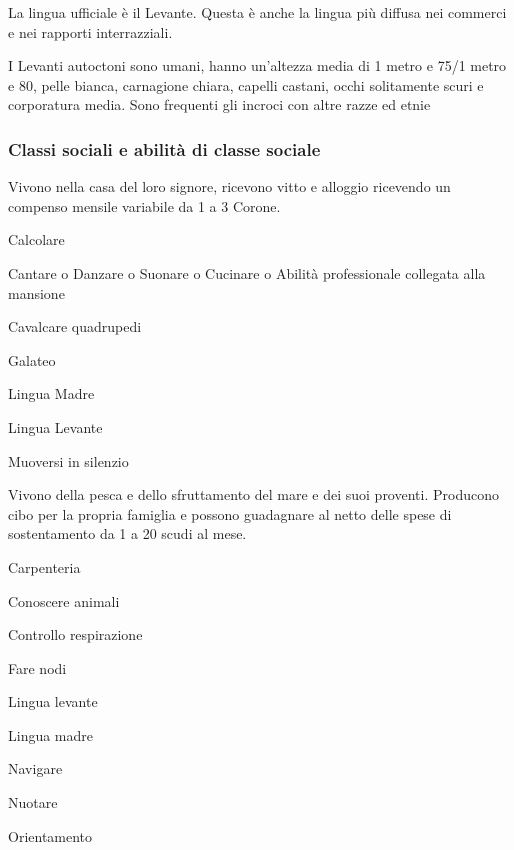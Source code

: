 La lingua ufficiale \`e il Levante. Questa \`e anche la lingua
pi\`u diffusa nei commerci e nei rapporti interrazziali.
\fi

\Fisico I Levanti autoctoni sono umani, hanno un'altezza media di 1
metro e 75/1 metro e 80, pelle bianca, carnagione chiara, capelli
castani, occhi solitamente scuri e corporatura media. Sono frequenti
gli incroci con altre razze ed etnie

\minmaxumani

\subsubsection{Classi sociali e abilit\`a di classe sociale}


Vivono nella casa del loro signore, ricevono vitto e alloggio
ricevendo un compenso mensile variabile da 1 a 3 Corone.

\begin{abilist}
\item Calcolare 
\item Cantare o Danzare o Suonare o Cucinare o Abilit\`a professionale collegata
alla mansione 
\item Cavalcare quadrupedi 
\item Galateo 
\item Lingua Madre
\item Lingua Levante
\item Muoversi in silenzio
\end{abilist}


Vivono della pesca e dello sfruttamento del mare e dei suoi proventi.
Producono cibo per la propria famiglia e possono guadagnare al netto
delle spese di sostentamento da 1 a 20 scudi al mese.

\begin{abilist}
\item Carpenteria
\item Conoscere animali 
\item Controllo respirazione
\item Fare nodi 
\item Lingua levante 
\item Lingua madre
\item Navigare
\item Nuotare
\item Orientamento 
\end{abilist}

